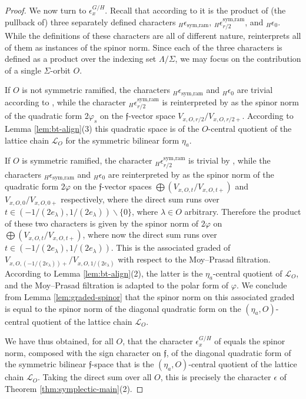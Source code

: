 \documentclass{article}
\def\mc#1{\mathcal{#1}}
\def\tx#1{\textrm{#1}}
\def\sm{\smallsetminus}
\theoremstyle{definition}
\numberwithin{equation}{subsection}
\renewcommand{\-}{\hyp{}}
\newcommand{\rf}{\mathfrak{f}}
\begin{document}
\begin{proof}
	We now turn to $\epsilon_x^{G/H}$. Recall that according to \cite[Definition 5.5.8]{FKS23} it is the product of (the pullback of) three separately defined characters $_H\epsilon_\tx{sym,ram}$, $_H\epsilon_{r/2}^\tx{sym,ram}$, and $_H\epsilon_0$. While the definitions of these characters are all of different nature, \cite[Remark 5.5.10]{FKS23} reinterprets all of them as instances of the spinor norm. Since each of the three characters is defined as a product over the indexing set $\Lambda/\Sigma$, we may focus on the contribution of a single $\Sigma$-orbit $O$. 

	If $O$ is not symmetric ramified, the characters $_H\epsilon_\tx{sym,ram}$ and $_H\epsilon_0$ are trivial according to \cite[Definitions 5.5.1, 5.5.7]{FKS23}, while the character $_H\epsilon_{r/2}^\tx{sym,ram}$ is reinterpreted by \cite[Remark 5.5.10]{FKS23} as the spinor norm of the quadratic form $2\varphi_s$ on the $\rf$-vector space $V_{x,O,r/2}/V_{x,O,r/2+}$. According to Lemma \ref{lem:bt-align}(3) this quadratic space is of the $O$-central quotient of the lattice chain $\mc{L}_O$ for the symmetric bilinear form $\eta_a$.

	If $O$ is symmetric ramified, the character $_H\epsilon_{r/2}^\tx{sym,ram}$ is trivial by \cite[Definition 5.5.5]{FKS23}, while the characters $_H\epsilon_\tx{sym,ram}$ and $_H\epsilon_0$ are reinterpreted by \cite[Remark 5.5.10]{FKS23} as the spinor norm of the quadratic form $2\varphi$ on the $\rf$-vector spaces $\bigoplus (V_{x,O,t}/V_{x,O,t+})$ and $V_{x,O,0}/V_{x,O,0+}$ respectively, where the direct sum runs over $t \in (-1/(2e_\lambda),1/(2e_\lambda)) \sm \{0\}$, where $\lambda \in O$ arbitrary. Therefore the product of these two characters is given by the spinor norm of $2\varphi$ on $\bigoplus (V_{x,O,t}/V_{x,O,t+})$, where now the direct sum runs over $t \in (-1/(2e_\lambda),1/(2e_\lambda))$. This is the associated graded of $V_{x,O,(-1/(2e_\lambda))+}/V_{x,O,1/(2e_\lambda)}$ with respect to the Moy--Prasad filtration. According to Lemma \ref{lem:bt-align}(2), the latter is the $\eta_a$-central quotient of $\mc{L}_O$, and the Moy--Prasad filtration is adapted to the polar form of $\varphi$. We conclude from Lemma \ref{lem:graded-spinor} that the spinor norm on this associated graded is equal to the spinor norm of the diagonal quadratic form on the $(\eta_a,O)$-central quotient of the lattice chain $\mc{L}_O$.
	
	We have thus obtained, for all $O$, that the character $\epsilon_x^{G/H}$ of \cite{FKS23} equals the spinor norm, composed with the sign character on $\rf$, of the diagonal quadratic form of the symmetric bilinear $\rf$-space that is the $(\eta_a,O)$-central quotient of the lattice chain $\mc{L}_O$. Taking the direct sum over all $O$, this is precisely the character $\epsilon$ of Theorem \ref{thm:symplectic-main}(2).
	

\end{proof}
\end{document}
